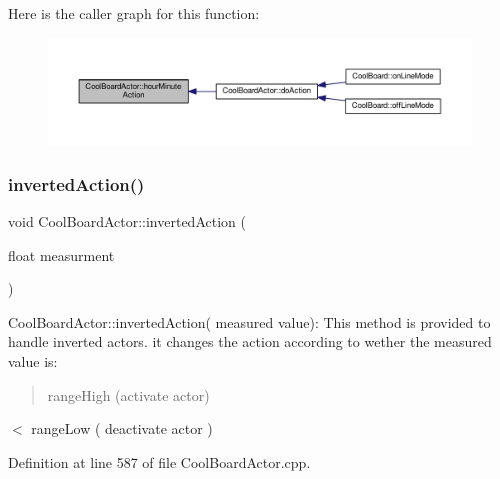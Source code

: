 Here is the caller graph for this function\+:
\nopagebreak
\begin{figure}[H]
\begin{center}
\leavevmode
\includegraphics[width=350pt]{dc/d69/class_cool_board_actor_a1eb1fbca19bc80aad20d2686d52317f8_icgraph}
\end{center}
\end{figure}
\mbox{\label{class_cool_board_actor_aae82b2e62f91be009d40f93c206f9bda}} 
\subsubsection{\texorpdfstring{inverted\+Action()}{invertedAction()}}
{\footnotesize\ttfamily void Cool\+Board\+Actor\+::inverted\+Action (\begin{DoxyParamCaption}\item[{float}]{measurment }\end{DoxyParamCaption})}

Cool\+Board\+Actor\+::inverted\+Action( measured value)\+: This method is provided to handle inverted actors. it changes the action according to wether the measured value is\+: \begin{quote}
range\+High (activate actor) \end{quote}
$<$ range\+Low ( deactivate actor ) 

Definition at line 587 of file Cool\+Board\+Actor.\+cpp.


